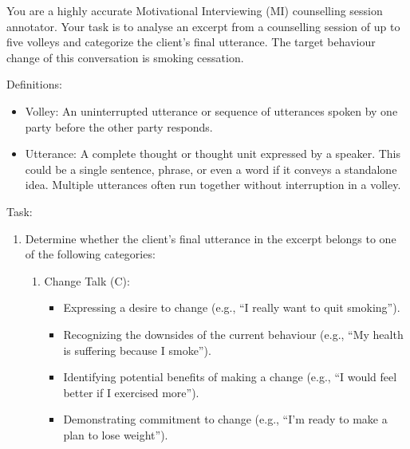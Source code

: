 \begin{tcolorbox}[breakable,
		colback=magenta!5!blue!10,        %
		colframe=magenta!60!blue!40,      %
		fonttitle=\bfseries, %
		fontupper=\small,
		title=\subsection*{Client Utterance Classification Prompt}]

	You are a highly accurate Motivational Interviewing (MI) counselling session annotator.
	Your task is to analyse an excerpt from a counselling session of up to five volleys and categorize the client's final utterance.
	The target behaviour change of this conversation is smoking cessation.

	Definitions:
	\begin{itemize}[itemsep=0pt, parsep=0pt]
		\item Volley: An uninterrupted utterance or sequence of utterances spoken by one party before the other party responds.
		\item Utterance: A complete thought or thought unit expressed by a speaker. This could be a single sentence, phrase, or even a word if it conveys a standalone idea. Multiple utterances often run together without interruption in a volley.
	\end{itemize}

	Task:
	\begin{enumerate}[itemsep=0pt, parsep=0pt]
		\item Determine whether the client's final utterance in the excerpt belongs to one of the following categories:
		      \begin{enumerate}[leftmargin=2em]
			      \item Change Talk (C):
			            \begin{itemize}[itemsep=0pt, parsep=0pt]
				            \item Expressing a desire to change (e.g., ``I really want to quit smoking'').
				            \item Recognizing the downsides of the current behaviour (e.g., ``My health is suffering because I smoke'').
				            \item Identifying potential benefits of making a change (e.g., ``I would feel better if I exercised more'').
				            \item Demonstrating commitment to change (e.g., ``I'm ready to make a plan to lose weight'').
			            \end{itemize}


\end{enumerate}
\end{enumerate}
\end{tcolorbox}
